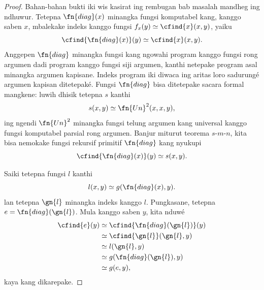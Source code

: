 \documentclass[../../../include/open-logic-section]{subfiles}
\begin{document}
\begin{proof}
Bahan-bahan bukti iki wis kasirat ing rembugan
bab masalah mandheg ing ndhuwur. Tetepna
$\fn{diag}(x)$ minangka fungsi komputabel kang,
kanggo saben $x$, mbalekake indeks kanggo fungsi
$f_x(y) \simeq \cfind{x}(x,y)$, yaiku
\[
\cfind{\fn{diag}(x)}(y) \simeq \cfind{x}(x,y).
\]
Anggepen $\fn{diag}$ minangka fungsi kang ngowahi
program kanggo fungsi rong argumen dadi program
kanggo fungsi siji argumen, kanthi netepake
program asal minangka argumen kapisane. Indeks program iki diwaca ing aritas loro sadurungé argumen kapisan ditetepaké.
Fungsi $\fn{diag}$ bisa ditetepake sacara formal
mangkene: luwih dhisik tetepna $s$ kanthi
\[
s(x,y) \simeq \fn{Un}^2(x,x,y),
\]
ing ngendi $\fn{Un}^2$ minangka fungsi telung
argumen kang universal kanggo fungsi komputabel
parsial rong argumen. Banjur miturut teorema
$s$-$m$-$n$, kita bisa nemokake fungsi rekursif
primitif $\fn{diag}$ kang nyukupi
\[
\cfind{\fn{diag}(x)}(y) \simeq s(x,y).
\]

Saiki tetepna fungsi $l$ kanthi
\[
l(x,y) \simeq g(\fn{diag}(x),y).
\]
lan tetepna $\gn{l}$ minangka indeks kanggo $l$.
Pungkasane, tetepna $e = \fn{diag}(\gn{l})$.
Mula kanggo saben $y$, kita nduwé
\begin{align*}
\cfind{e}(y) & \simeq \cfind{\fn{diag}(\gn{l})}(y) \\
& \simeq \cfind{\gn{l}}(\gn{l}, y) \\
& \simeq l(\gn{l}, y) \\
& \simeq g(\fn{diag}(\gn{l}),y) \\
& \simeq g(e, y),
\end{align*}
kaya kang dikarepake.
\end{proof}
\end{document}
